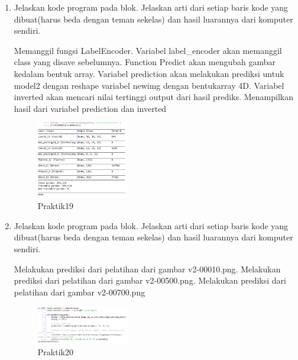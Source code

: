 \begin{enumerate}
\item Jelaskan kode program pada blok. Jelaskan arti dari setiap baris kode yang dibuat(harus beda dengan teman sekelas) dan hasil luarannya dari komputer sendiri.

Memanggil fungsi LabelEncoder. Variabel label\_encoder akan memanggil class yang disave sebelumnya. Function Predict akan mengubah gambar kedalam bentuk array. Variabel prediction akan melakukan prediksi untuk model2 dengan reshape variabel newimg dengan bentukarray 4D. Variabel inverted akan mencari nilai tertinggi output dari hasil prediks. Menampilkan hasil dari variabel prediction dan inverted



	\begin{figure}[H]
		\includegraphics[width=4cm]{figures/1174008/7/praktik19.PNG}
            	\centering
           	 \caption{Praktik19}
       	 \end{figure}

\item Jelaskan kode program pada blok. Jelaskan arti dari setiap baris kode yang dibuat(harus beda dengan teman sekelas) dan hasil luarannya dari komputer sendiri.

Melakukan prediksi dari pelatihan dari gambar v2-00010.png. Melakukan prediksi dari pelatihan dari gambar v2-00500.png. Melakukan prediksi dari pelatihan dari gambar v2-00700.png



	\begin{figure}[H]
		\includegraphics[width=4cm]{figures/1174008/7/praktik20.PNG}
            	\centering
           	 \caption{Praktik20}
       	 \end{figure}

\end{enumerate}

